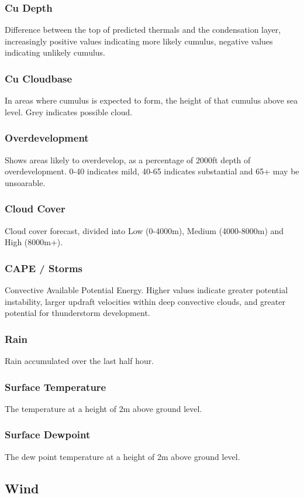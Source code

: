 \documentclass[11pt,a4paper]{article}
\begin{document}
\subsubsection{Cu Depth}
Difference between the top of predicted thermals and the condensation layer, increasingly positive values indicating more likely cumulus, negative values indicating unlikely cumulus.
\subsubsection{Cu Cloudbase}
In areas where cumulus is expected to form, the height of that cumulus above sea level. Grey indicates possible cloud.
\subsubsection{Overdevelopment}
Shows areas likely to overdevelop, as a percentage of 2000ft depth of overdevelopment. 0-40 indicates mild, 40-65 indicates substantial and 65+ may be unsoarable.
\subsubsection{Cloud Cover}
Cloud cover forecast, divided into Low (0-4000m), Medium (4000-8000m) and High (8000m+).
\subsubsection{CAPE / Storms}
Convective Available Potential Energy. Higher values indicate greater potential instability, larger updraft velocities within deep convective clouds, and greater potential for thunderstorm development.
\subsubsection{Rain}
Rain accumulated over the last half hour.
\subsubsection{Surface Temperature}
The temperature at a height of 2m above ground level.
\subsubsection{Surface Dewpoint}
The dew point temperature at a height of 2m above ground level.
\subsection{Wind}
\end{document}
